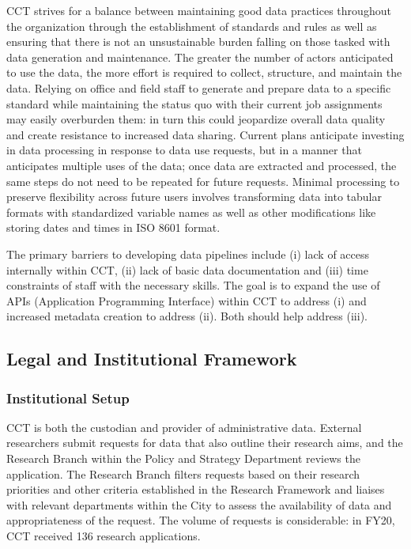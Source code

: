 \documentclass[
]{WileySix}
\begin{document}
CCT strives for a balance between maintaining good data practices throughout the organization through the establishment of standards and rules as well as ensuring that there is not an unsustainable burden falling on those tasked with data generation and maintenance. The greater the number of actors anticipated to use the data, the more effort is required to collect, structure, and maintain the data. Relying on office and field staff to generate and prepare data to a specific standard while maintaining the status quo with their current job assignments may easily overburden them: in turn this could jeopardize overall data quality and create resistance to increased data sharing. Current plans anticipate investing in data processing in response to data use requests, but in a manner that anticipates multiple uses of the data; once data are extracted and processed, the same steps do not need to be repeated for future requests. Minimal processing to preserve flexibility across future users involves transforming data into tabular formats with standardized variable names as well as other modifications like storing dates and times in ISO 8601 format.

The primary barriers to developing data pipelines include (i) lack of access internally within CCT, (ii) lack of basic data documentation and (iii) time constraints of staff with the necessary skills. The goal is to expand the use of APIs (Application Programming Interface) within CCT to address (i) and increased metadata creation to address (ii). Both should help address (iii).

\hypertarget{legal-and-institutional-framework-6}{%
\subsection{Legal and Institutional Framework}\label{legal-and-institutional-framework-6}}

\hypertarget{institutional-setup-6}{%
\subsubsection{Institutional Setup}\label{institutional-setup-6}}

CCT is both the custodian and provider of administrative data. External researchers submit requests for data that also outline their research aims, and the Research Branch within the Policy and Strategy Department reviews the application. The Research Branch filters requests based on their research priorities and other criteria established in the Research Framework and liaises with relevant departments within the City to assess the availability of data and appropriateness of the request. The volume of requests is considerable: in FY20, CCT received 136 research applications.
\end{document}

